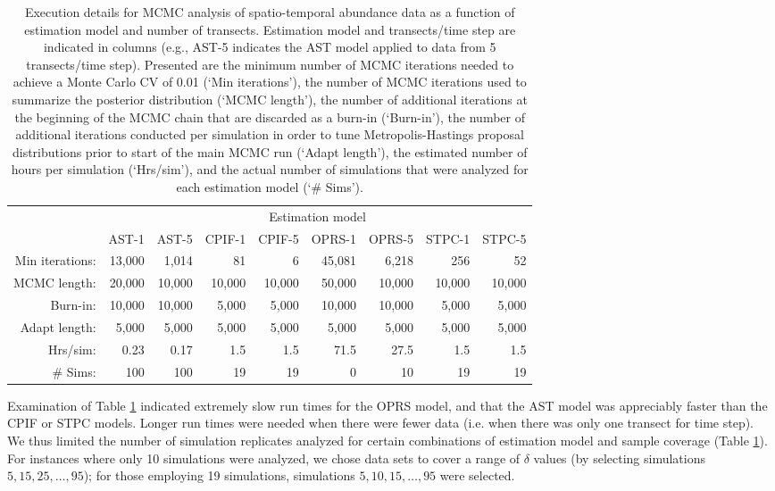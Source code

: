 \documentclass[12pt,fleqn]{article}
\begin{document}
\begin{flushleft}
\begin{table}
\caption{ Execution details for MCMC analysis of spatio-temporal abundance data as a function of estimation model and number of transects.  Estimation model and transects/time step are indicated in columns (e.g., AST-5 indicates the AST model applied to data from 5 transects/time step).  Presented are the minimum number of MCMC iterations needed to achieve a Monte Carlo CV of 0.01 (`Min iterations'), the number of MCMC iterations used to summarize the posterior distribution (`MCMC length'), the number of additional iterations at the beginning of the MCMC chain that are discarded as a burn-in (`Burn-in'), the number of additional iterations conducted per simulation in order to tune Metropolis-Hastings proposal distributions prior to start of the main MCMC run (`Adapt length'), the estimated number of hours per simulation (`Hrs/sim'), and the actual number of simulations that were analyzed for each estimation model (`\# Sims').}
\label{tab:run_times}
\begin{tabular}{rrrrrrrrr}
\\
 & \multicolumn{8}{c}{Estimation model} \\
 & AST-1 & AST-5 & CPIF-1 & CPIF-5 & OPRS-1 & OPRS-5 & STPC-1 & STPC-5 \\
\hline \hline
Min iterations:  & 13,000 & 1,014 & 81 & 6 & 45,081 & 6,218 & 256 & 52 \\
MCMC length: & 20,000  & 10,000 & 10,000 & 10,000 & 50,000 & 10,000 & 10,000 & 10,000 \\
Burn-in: & 10,000 & 10,000 & 5,000 & 5,000 & 10,000 & 10,000 & 5,000 & 5,000 \\
Adapt length: & 5,000 & 5,000 & 5,000 & 5,000 & 5,000 & 5,000 & 5,000 & 5,000 \\
Hrs/sim:   & 0.23 & 0.17 & 1.5 & 1.5 & 71.5 & 27.5 & 1.5 & 1.5 \\
\# Sims:  & 100 & 100 & 19 & 19 & 0 & 10 & 19 & 19 \\
\hline
\end{tabular}
\end{table}

\hspace{.5in} Examination of Table \ref{tab:run_times} indicated extremely slow run times for the OPRS model, and that the AST model was appreciably faster than the CPIF or STPC models.  Longer run times were needed when there were fewer data (i.e. when there was only one transect for time step).  We thus limited the number of simulation replicates analyzed for certain combinations of estimation model and sample coverage (Table \ref{tab:run_times}).  For instances where only 10 simulations were analyzed, we chose data sets to cover a range of $\delta$ values (by selecting simulations $5, 15, 25, \hdots, 95$); for those employing 19 simulations, simulations $5, 10, 15, \hdots, 95$ were selected.



\end{flushleft}
\end{document}
